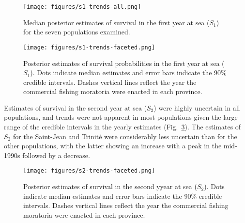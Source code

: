 \documentclass[12pt]{article}
\newcommand{\So}{$S_{1}$\xspace}
\newcommand{\St}{$S_{2}$\xspace}
\begin{document}

\begin{figure}[htbp] \centering
    \texttt{[image: figures/s1-trends-all.png]}
    \caption{Median posterior estimates of survival in the first year at sea (\So) 
        for the seven populations examined.} \label{fig:s1-dual} 
\end{figure}


\begin{figure}[htbp] \centering
    \texttt{[image: figures/s1-trends-faceted.png]}
    \caption{Posterior estimates of survival probabilities in the first year at sea (\So). Dots indicate median estimates and error
        bars indicate the 90\% credible intervals. Dashes vertical lines reflect the year the commercial fishing moratoria were enacted
    in each province.} \label{fig:s1-faceted}
\end{figure}

Estimates of survival in the second year at sea (\St) were highly uncertain in all populations, and trends 
were not apparent in most populations given the large range of the credible
intervals in the yearly estimates (Fig.~\ref{fig:s2-faceted}). The estimates
of \St for the Saint-Jean and Trinit\'{e} were considerably less uncertain
than for the other populations, with the latter showing an increase with a peak in the mid-1990s followed 
by a decrease.

\begin{figure}[htbp] \centering
    \texttt{[image: figures/s2-trends-faceted.png]}
    \caption{Posterior estimates of survival in the second yyear at sea (\St).
 Dots indicate median estimates and error bars indicate the 90\% credible
 intervals. Dashes vertical lines reflect the year the commercial fishing
 moratoria were enacted in each province.} \label{fig:s2-faceted}
\end{figure}
\end{document}
